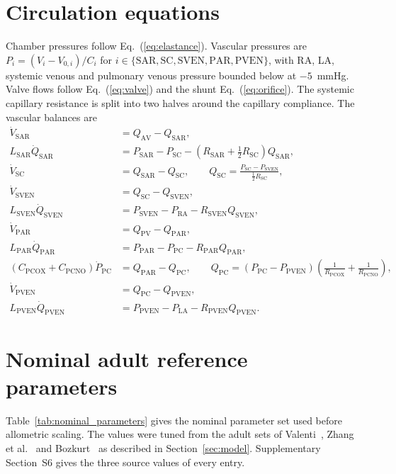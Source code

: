 \clearpage
\printbibliography

\clearpage
\appendix
\section{Circulation equations}
\label{app:circuit}
Chamber pressures follow Eq.~(\ref{eq:elastance}). Vascular pressures are $P_i = (V_i - V_{0,i})/C_i$ for $i \in \{\mathrm{SAR}, \mathrm{SC}, \mathrm{SVEN}, \mathrm{PAR}, \mathrm{PVEN}\}$, with RA, LA, systemic venous and pulmonary venous pressure bounded below at $-5$~mmHg. Valve flows follow Eq.~(\ref{eq:valve}) and the shunt Eq.~(\ref{eq:orifice}). The systemic capillary resistance is split into two halves around the capillary compliance. The vascular balances are
\begin{align}
\dot{V}_{\mathrm{SAR}} &= Q_{\mathrm{AV}} - Q_{\mathrm{SAR}}, \\
L_{\mathrm{SAR}}\dot{Q}_{\mathrm{SAR}} &= P_{\mathrm{SAR}} - P_{\mathrm{SC}} - \left(R_{\mathrm{SAR}} + \tfrac{1}{2}R_{\mathrm{SC}}\right)Q_{\mathrm{SAR}}, \\
\dot{V}_{\mathrm{SC}} &= Q_{\mathrm{SAR}} - Q_{\mathrm{SC}}, \qquad Q_{\mathrm{SC}} = \frac{P_{\mathrm{SC}} - P_{\mathrm{SVEN}}}{\tfrac{1}{2}R_{\mathrm{SC}}}, \\
\dot{V}_{\mathrm{SVEN}} &= Q_{\mathrm{SC}} - Q_{\mathrm{SVEN}}, \\
L_{\mathrm{SVEN}}\dot{Q}_{\mathrm{SVEN}} &= P_{\mathrm{SVEN}} - P_{\mathrm{RA}} - R_{\mathrm{SVEN}}Q_{\mathrm{SVEN}}, \\
\dot{V}_{\mathrm{PAR}} &= Q_{\mathrm{PV}} - Q_{\mathrm{PAR}}, \\
L_{\mathrm{PAR}}\dot{Q}_{\mathrm{PAR}} &= P_{\mathrm{PAR}} - P_{\mathrm{PC}} - R_{\mathrm{PAR}}Q_{\mathrm{PAR}}, \\
\left(C_{\mathrm{PCOX}} + C_{\mathrm{PCNO}}\right)\dot{P}_{\mathrm{PC}} &= Q_{\mathrm{PAR}} - Q_{\mathrm{PC}}, \qquad Q_{\mathrm{PC}} = \left(P_{\mathrm{PC}} - P_{\mathrm{PVEN}}\right)\left(\frac{1}{R_{\mathrm{PCOX}}} + \frac{1}{R_{\mathrm{PCNO}}}\right), \\
\dot{V}_{\mathrm{PVEN}} &= Q_{\mathrm{PC}} - Q_{\mathrm{PVEN}}, \\
L_{\mathrm{PVEN}}\dot{Q}_{\mathrm{PVEN}} &= P_{\mathrm{PVEN}} - P_{\mathrm{LA}} - R_{\mathrm{PVEN}}Q_{\mathrm{PVEN}}.
\end{align}

\section{Nominal adult reference parameters}
\label{app:nominal_parameters}
Table~\ref{tab:nominal_parameters} gives the nominal parameter set used before allometric scaling. The values were tuned from the adult sets of Valenti~\cite{Valenti2023}, Zhang et al.~\cite{zhang2019multiscale} and Bozkurt~\cite{Bozkurt2019} as described in Section~\ref{sec:model}. Supplementary Section~S6 gives the three source values of every entry.

